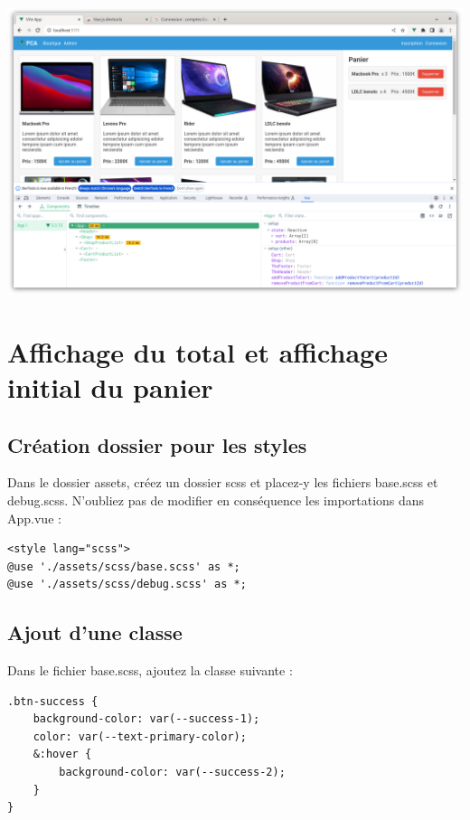\begin{center}
\includegraphics[width=15cm]{images/image23.png}
\end{center}

\section{Affichage du total et affichage initial du panier}
\subsection{Création dossier pour les styles}
Dans le dossier {\color{monOrange}assets}, créez un dossier {\color{monOrange}scss} et placez-y les fichiers {\color{monOrange}base.scss} et {\color{monOrange}debug.scss}. N'oubliez pas de modifier en conséquence les importations dans {\color{monOrange}App.vue} :
\begin{verbatim}
<style lang="scss">
@use './assets/scss/base.scss' as *;
@use './assets/scss/debug.scss' as *;
\end{verbatim}

\subsection{Ajout d'une classe}
Dans le fichier {\color{monOrange}base.scss}, ajoutez la classe suivante :
\begin{verbatim}
.btn-success {
    background-color: var(--success-1);
    color: var(--text-primary-color);
    &:hover {
        background-color: var(--success-2);
    }
}
\end{verbatim}
